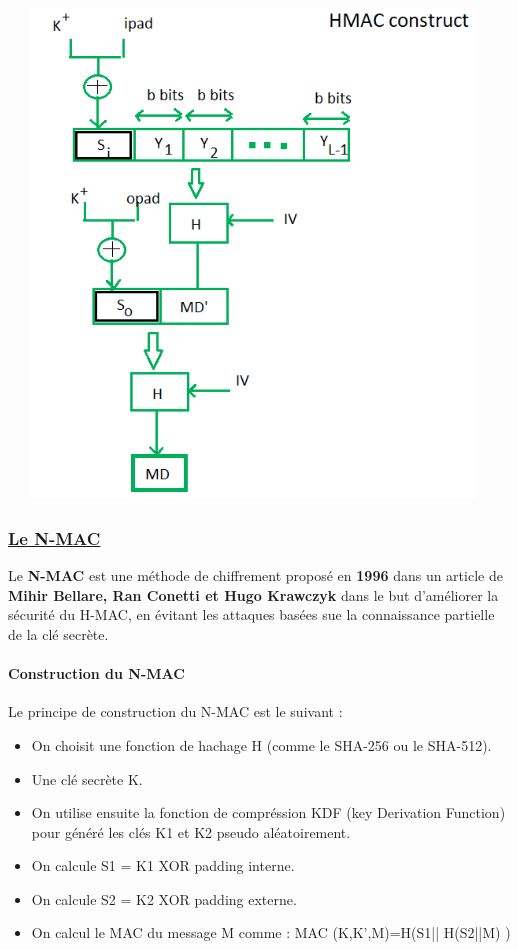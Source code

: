 \begin{center}
    \includegraphics[width=13cm, height=13cm]{Sections/Images/Hash.png}
\end{center}

\newpage
\subsubsection{\textbf{\underline{Le N-MAC}}}

Le \textbf{N-MAC} est une méthode de chiffrement proposé en \textbf{1996} dans un article de \textbf{Mihir Bellare, Ran Conetti et Hugo Krawczyk} dans le but d’améliorer la sécurité du H-MAC, en évitant les attaques basées sue la connaissance partielle de la clé secrète.

\paragraph{Construction du N-MAC}
Le principe de construction du N-MAC est le suivant :
\begin{itemize} 
    \item [\textbullet] On choisit une fonction de hachage H (comme le SHA-256 ou le SHA-512).
    \item [\textbullet] Une clé secrète K.
    \item [\textbullet] On utilise ensuite la fonction de compréssion KDF (key Derivation Function) pour généré les clés K1 et K2 pseudo aléatoirement.
    \item [\textbullet] On calcule S1 = K1 XOR padding interne.
    \item [\textbullet] On calcule S2 = K2 XOR padding externe.
    \item [\textbullet] On calcul le MAC du message M comme :
    MAC (K,K’,M)=H(S1|| H(S2||M) )
\end{itemize}

